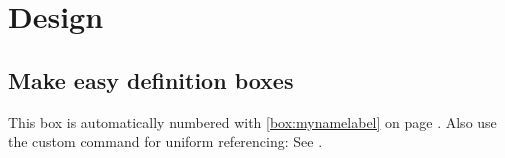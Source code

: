 \chapter{Design}\label{chap:design}

\section{Make easy definition boxes}


This box is automatically numbered with \ref{box:mynamelabel} on page
\pageref{box:mynamelabel}. Also use the custom command for uniform referencing: See .